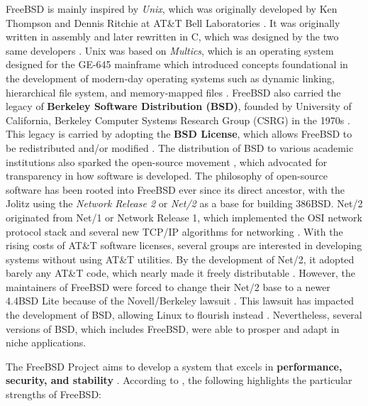 FreeBSD is mainly inspired by \textit{Unix}, which was originally developed by Ken Thompson and Dennis Ritchie
at AT\&T Bell Laboratories \parencite{urban_tiemman2001}. It was originally written in assembly and later rewritten in C,
which was designed by the two same developers \parencite{urban_tiemman2001}. Unix was based on \textit{Multics}, which
is an operating system designed for the GE-645 mainframe \parencite{freebsd_intro} which introduced concepts foundational in
the development of modern-day operating systems such as dynamic linking, hierarchical file system, and memory-mapped files
\parencite{freebsd_intro}. FreeBSD also carried the legacy of \textbf{Berkeley Software Distribution (BSD)}, founded by
University of California, Berkeley Computer Systems Research Group (CSRG) in the 1970s \parencite{freebsd_torchbearer}.
This legacy is carried by adopting the \textbf{BSD License}, which allows FreeBSD to be redistributed and/or modified
\parencite{opensource2011}. The distribution of BSD to various academic institutions also sparked the open-source
movement \parencite{jude2020}, which advocated for transparency in how software is developed.
The philosophy of open-source software has been rooted into FreeBSD ever since its direct ancestor, with the Jolitz
using the \textit{Network Release 2} or \textit{Net/2} as a base for building 386BSD. Net/2 originated from Net/1 or
Network Release 1, which implemented the OSI network protocol stack and several new TCP/IP algorithms for networking
\parencite{jude2020}. With the rising costs of AT\&T software licenses, several groups are interested in developing
systems without using AT\&T utilities. By the development of Net/2, it adopted barely any AT\&T code, which nearly made
it freely distributable \parencite{jude2020}. However, the maintainers of FreeBSD were forced to change their Net/2
base to a newer 4.4BSD Lite because of the Novell/Berkeley lawsuit \parencite{howard}. This lawsuit has impacted
the development of BSD, allowing Linux to flourish instead \parencite{hubbard_andrews2002}. Nevertheless, several
versions of BSD, which includes FreeBSD, were able to prosper and adapt in niche applications.

The FreeBSD Project aims to develop a system that excels in \textbf{performance, security, and stability}
\parencite{freebsd_faq}. According to \textcite{freebsd_intro}, the following highlights the particular
strengths of FreeBSD:


